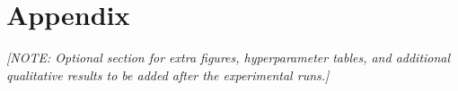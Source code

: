 \documentclass[conference,10pt]{IEEEtran}
\begin{document}
\section*{Appendix}

\textit{[NOTE: Optional section for extra figures, hyperparameter tables, and additional qualitative results to be added after the experimental runs.]}
\end{document}
